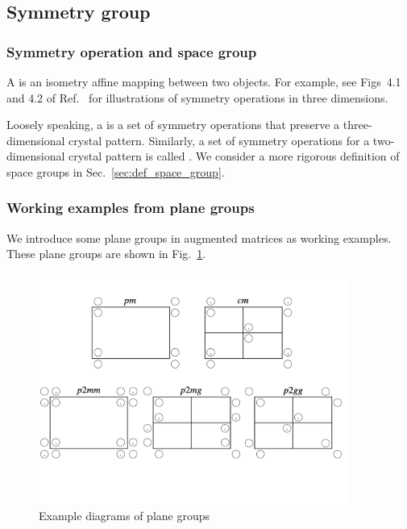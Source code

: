 \subsection{Symmetry group}

\subsubsection{Symmetry operation and space group}

A  is an isometry affine mapping between two objects.
For example, see Figs~4.1 and 4.2 of Ref.~\cite{muller2013symmetry} for illustrations of symmetry operations in three dimensions.

Loosely speaking, a  is a set of symmetry operations that preserve a three-dimensional crystal pattern.
Similarly, a set of symmetry operations for a two-dimensional crystal pattern is called .
We consider a more rigorous definition of space groups in Sec.~\ref{sec:def_space_group}.

\subsubsection{Working examples from plane groups}

We introduce some plane groups in augmented matrices as working examples.
These plane groups are shown in Fig.~\ref{fig:plane-group-diagrams}.

\begin{figure}[tb]
  \centering
  \includegraphics[width=0.9\textwidth]{figure/fig_plane_groups.png}
  \caption{Example diagrams of plane groups}
  \label{fig:plane-group-diagrams}
\end{figure}

